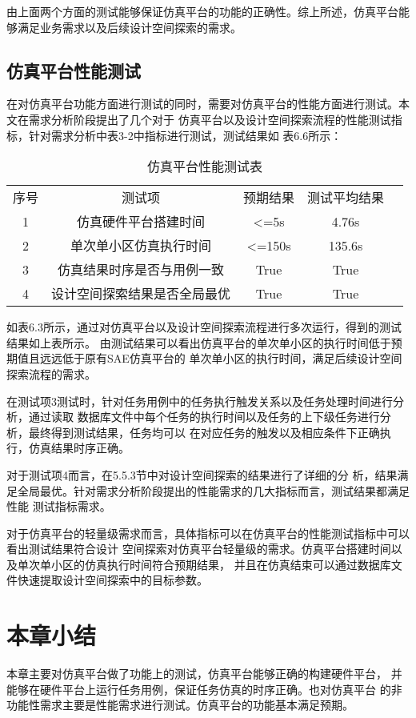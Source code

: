 由上面两个方面的测试能够保证仿真平台的功能的正确性。综上所述，仿真平台能够满足业务需求以及后续设计空间探索的需求。

\subsection{仿真平台性能测试}
在对仿真平台功能方面进行测试的同时，需要对仿真平台的性能方面进行测试。本文在需求分析阶段提出了几个对于
仿真平台以及设计空间探索流程的性能测试指标，针对需求分析中表3-2中指标进行测试，测试结果如
表6.6所示：

\begin{table}[htb]
    \centering\normalsize
    \caption{仿真平台性能测试表}
    \begin{tabular}{|c|c|c|c|l}
    \cline{1-4}
    序号 & 测试项            & 预期结果              & 测试平均结果   &  \\ \cline{1-4}
    1  & 仿真硬件平台搭建时间     & \textless{}=5s    & 4.76s  &  \\ \cline{1-4}
    2  & 单次单小区仿真执行时间    & \textless{}=150s   & 135.6s &  \\ \cline{1-4}
    3  & 仿真结果时序是否与用例一致  & True              & True   &  \\ \cline{1-4}
    4  & 设计空间探索结果是否全局最优 & True              & True   &  \\ \cline{1-4}
    \end{tabular}
    \end{table}

如表6.3所示，通过对仿真平台以及设计空间探索流程进行多次运行，得到的测试结果如上表所示。
由测试结果可以看出仿真平台的单次单小区的执行时间低于预期值且远远低于原有SAE仿真平台的
单次单小区的执行时间，满足后续设计空间探索流程的需求。

在测试项3测试时，针对任务用例中的任务执行触发关系以及任务处理时间进行分析，通过读取
数据库文件中每个任务的执行时间以及任务的上下级任务进行分析，最终得到测试结果，任务均可以
在对应任务的触发以及相应条件下正确执行，仿真结果时序正确。

对于测试项4而言，在5.5.3节中对设计空间探索的结果进行了详细的分
析，结果满足全局最优。针对需求分析阶段提出的性能需求的几大指标而言，测试结果都满足性能
测试指标需求。

对于仿真平台的轻量级需求而言，具体指标可以在仿真平台的性能测试指标中可以看出测试结果符合设计
空间探索对仿真平台轻量级的需求。仿真平台搭建时间以及单次单小区的仿真执行时间符合预期结果，
并且在仿真结束可以通过数据库文件快速提取设计空间探索中的目标参数。  

\section{本章小结}

本章主要对仿真平台做了功能上的测试，仿真平台能够正确的构建硬件平台，
并能够在硬件平台上运行任务用例，保证任务仿真的时序正确。也对仿真平台
的非功能性需求主要是性能需求进行测试。仿真平台的功能基本满足预期。